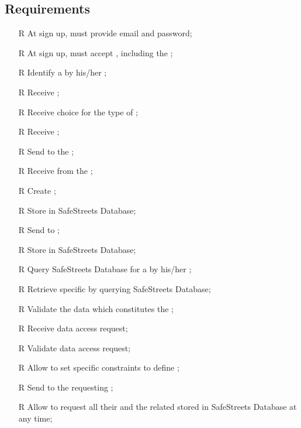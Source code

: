 \documentclass[../../../RASD.tex]{subfiles}
\begin{document}
\subsection{Requirements\label{sect:3.2.5}}
\begin{itemize}
	
	\item[R\subs{1}]At sign up,  must provide email and password;
	\item[R\subs{2}]At sign up,  must accept , including the ;
	\item[R\subs{3}]Identify a  by his/her ;
	\item[R\subs{4}]Receive ;
	\item[R\subs{5}]Receive  choice for the type of ;
	\item[R\subs{6}]Receive ;
	\item[R\subs{7}]Send  to the ;
	\item[R\subs{8}]Receive  from the ;
	\item[R\subs{9}]Create ;
	\item[R\subs{10}]Store  in SafeStreets Database;
	\item[R\subs{11}]Send  to ;
	\item[R\subs{12}]Store  in SafeStreets Database;
	\item[R\subs{13}]Query SafeStreets Database for a  by his/her ;
	\item[R\subs{14}]Retrieve specific  by querying SafeStreets Database;
	\item[R\subs{15}]Validate the data which constitutes the ;
	\item[R\subs{16}]Receive  data access request;
	\item[R\subs{17}]Validate  data access request;
	\item[R\subs{18}]Allow  to set specific constraints to define ;
	\item[R\subs{19}]Send  to the requesting ;
	\item[R\subs{20}]Allow  to request all their  and the related  stored in SafeStreets Database at any time;

\end{itemize}
\end{document}
